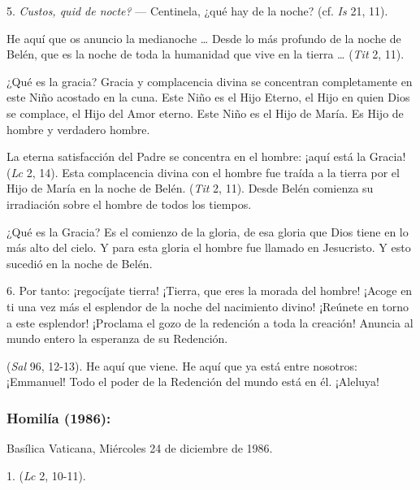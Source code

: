 \begin{body}
\begin{body}
		5. \emph{Custos, quid de nocte?} --- Centinela, ¿qué hay de la noche? (cf. \emph{Is} 21, 11).

		He aquí que os anuncio la medianoche \ldots{} Desde lo más profundo de la noche de Belén, que es la noche de toda la humanidad que vive en la tierra \ldots{}  (\emph{Tit} 2, 11).

		¿Qué es la gracia? Gracia y complacencia divina se concentran completamente en este Niño acostado en la cuna. Este Niño es el Hijo Eterno, el Hijo en quien Dios se complace, el Hijo del Amor eterno. Este Niño es el Hijo de María. Es Hijo de hombre y verdadero hombre.

		La eterna satisfacción del Padre se concentra en el hombre: ¡aquí está la Gracia!  (\emph{Lc} 2, 14). Esta complacencia divina con el hombre fue traída a la tierra por el Hijo de María en la noche de Belén.  (\emph{Tit} 2, 11). Desde Belén comienza su irradiación sobre el hombre de todos los tiempos.

		¿Qué es la Gracia? Es el comienzo de la gloria, de esa gloria que Dios tiene en lo más alto del cielo. Y para esta gloria el hombre fue llamado en Jesucristo. Y esto sucedió en la noche de Belén.

		6. Por tanto: ¡regocíjate tierra! ¡Tierra, que eres la morada del hombre! ¡Acoge en ti una vez más el esplendor de la noche del nacimiento divino! ¡Reúnete en torno a este esplendor! ¡Proclama el gozo de la redención a toda la creación! Anuncia al mundo entero la esperanza de su Redención.

		 (\emph{Sal} 96, 12-13). He aquí que viene. He aquí que ya está entre nosotros: ¡Emmanuel! Todo el poder de la Redención del mundo está en él. ¡Aleluya!
	\end{body}

	\subsubsection{Homilía (1986):}

	Basílica Vaticana, Miércoles 24 de diciembre de 1986.

	\begin{body}
		1.  (\emph{Lc} 2, 10-11).


\end{body}
\end{body}
